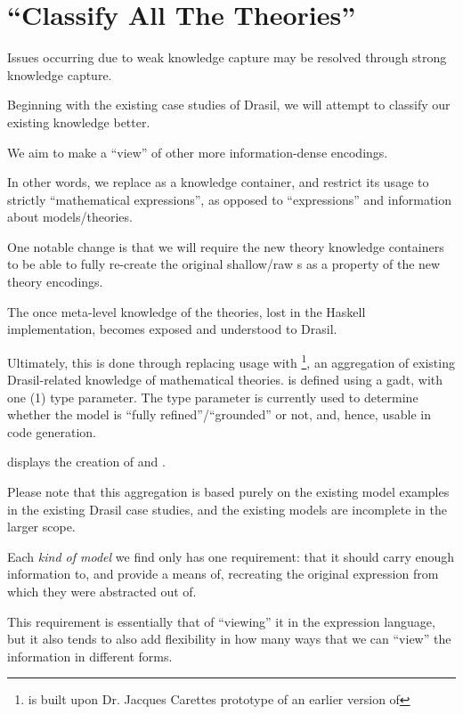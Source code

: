\section{\textquotedblleft{}Classify All The Theories\textquotedblright{}}

Issues occurring due to weak knowledge capture may be resolved through strong
knowledge capture.

Beginning with the existing case studies of Drasil, we will attempt to classify
our existing knowledge better.

We aim to make \RelationConcept{} a ``view'' of other more information-dense
encodings.

In other words, we replace \Expr{} as a knowledge container, and restrict its
usage to strictly ``mathematical expressions'', as opposed to ``expressions''
and information about models/theories.

One notable change is that we will require the new theory knowledge containers
to be able to fully re-create the original shallow/raw \Expr{}s as a property of
the new theory encodings.

The once meta-level knowledge of the theories, lost in the Haskell
implementation, becomes exposed and understood to Drasil.

Ultimately, this is done through replacing \RelationConcept{} usage with
\ModelKind{}\footnote{\ModelKind{} is built upon Dr. Jacques Carettes prototype
of an earlier version of \ModelKinds{}}, an aggregation of existing
Drasil-related knowledge of mathematical theories. \ModelKind{} is defined using
a \acs{gadt}, with one (1) type parameter. The type parameter is currently used
to determine whether the model is ``fully refined''/``grounded'' or not, and,
hence, usable in code generation.

 displays the creation of \ModelKind{} and
\ModelKinds{}.

Please note that this aggregation is based purely on the existing model examples
in the existing Drasil case studies, and the existing models are incomplete in
the larger scope.

Each \textit{kind of model} we find only has one requirement: that it should
carry enough information to, and provide a means of, recreating the original
expression from which they were abstracted out of.

This requirement is essentially that of ``viewing'' it in the expression
language, but it also tends to also add flexibility in how many ways that we can
``view'' the information in different forms.

